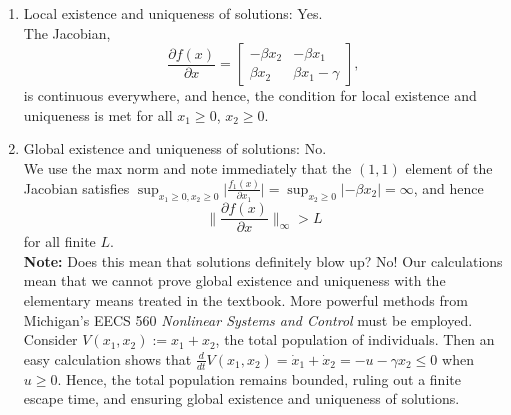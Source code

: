 \begin{enumerate}
\renewcommand{\labelenumi}{(\alph{enumi})}
 \setlength{\itemsep}{.2cm}
    \item Local existence and uniqueness of solutions: \Ans \quad Yes.\\

The Jacobian,
    $$ \frac{ \partial f(x)}{\partial x}= \left[ \begin{array}{cc}  -\beta x_2  & -\beta x_1 \\ \beta x_2 &  \beta x_1 - \gamma \end{array}\right],$$
    is continuous everywhere, and hence, the condition for local existence and uniqueness is met for all $x_1\ge 0$, $x_2\ge 0$. 

    
    \item Global existence and uniqueness of solutions: \Ans \quad No.\\

We use the max norm and note immediately that the $(1,1)$ element of the Jacobian satisfies $ \displaystyle \sup_{x_1\ge 0, x_2\ge 0} \Big|\frac{f_1(x)}{\partial x_1}\Big| = \sup_{x_2\ge 0} |-\beta x_2| = \infty$, and hence 
$$ \|\frac{\partial f(x)}{\partial x}  \|_\infty > L$$
for all finite $L$.\\

\textbf{Note:} Does this mean that solutions definitely blow up? No! Our calculations mean that we cannot prove global existence and uniqueness with the elementary means treated in the textbook. More powerful methods from Michigan's EECS 560 \textit{Nonlinear Systems and Control} must be employed. Consider $V(x_1, x_2):= x_1 + x_2$, the total population of individuals. Then an easy calculation shows that $\frac{d}{dt}V(x_1, x_2) = \dot{x}_1 + \dot{x}_2 = -u - \gamma x_2 \le 0$ when $u\ge 0$. Hence, the total population remains bounded, ruling out a finite escape time, and ensuring global existence and uniqueness of solutions.     
\end{enumerate}
\Qed

\bigskip



